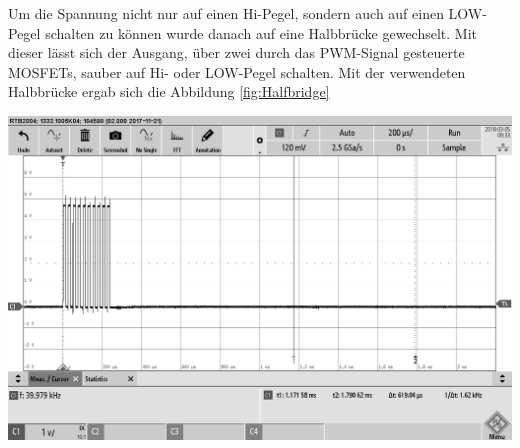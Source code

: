 Um die Spannung nicht nur auf einen Hi-Pegel, sondern auch auf einen LOW-Pegel schalten zu können wurde danach auf eine Halbbrücke gewechselt. Mit dieser lässt sich der Ausgang, über zwei durch das PWM-Signal gesteuerte MOSFETs, sauber auf Hi- oder LOW-Pegel schalten. %
Mit der verwendeten Halbbrücke ergab sich die Abbildung \ref{fig:Halfbridge}\\
\begin{minipage}{0.5\textwidth}
\includegraphics[width=1\textwidth%
]{Abbildungen/MessungenP1/PWM-Nach-der-Halbbrucke.png}
\label{fig:Halfbridge}
\end{minipage}
